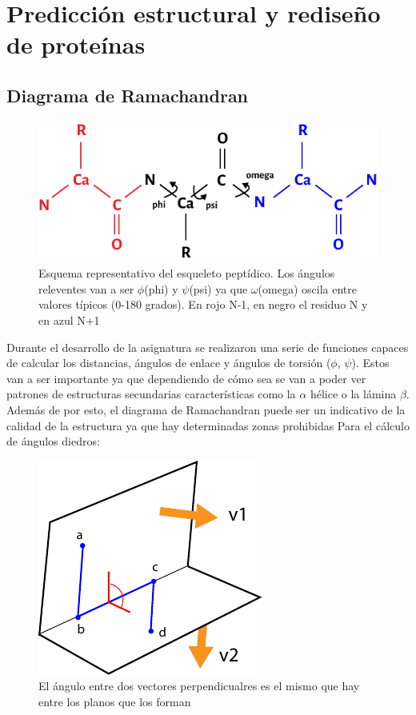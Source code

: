 \documentclass[a4paper,11pt]{report}
\begin{document}
 \section{Predicción estructural y rediseño de proteínas}
 \subsection{Diagrama de Ramachandran}
 \begin{figure}[htb!]
 	\centering
 	\includegraphics{Figuras/Figura14}
 	\caption{Esquema representativo del esqueleto peptídico. Los ángulos releventes van a ser $\phi$(phi) y $\psi$(psi) ya que $\omega$(omega) oscila entre valores típicos (0-180 grados). En rojo N-1, en negro el residuo N y en azul N+1}		
 \end{figure} 

 Durante el desarrollo de la asignatura se realizaron una serie de funciones capaces de calcular los distancias, ángulos de enlace y ángulos de torsión ($\phi$, $\psi$). Estos van a ser importante ya que dependiendo de cómo sea se van a poder ver patrones de estructuras secundarias características como la $\alpha$ hélice o la lámina $\beta$. Además de por esto, el diagrama de Ramachandran puede ser un indicativo de la calidad de la estructura ya que hay determinadas zonas prohibidas
 Para el cálculo de ángulos diedros:\\
 
 \begin{figure}[h]
 	\centering
 	 \includegraphics{Figuras/Figura46}
 	 \caption{El ángulo entre dos vectores perpendicualres es el mismo que hay entre los planos que los forman}
 \end{figure}
 
\end{document}
